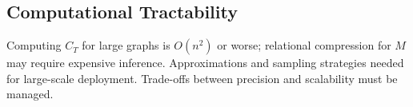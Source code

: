 \documentclass[12pt]{article}
\begin{document}
\subsection{Computational Tractability}

Computing $C_T$ for large graphs is $O(n^2)$ or worse; relational compression for $M$ may require expensive inference. Approximations and sampling strategies needed for large-scale deployment. Trade-offs between precision and scalability must be managed.



\end{document}
